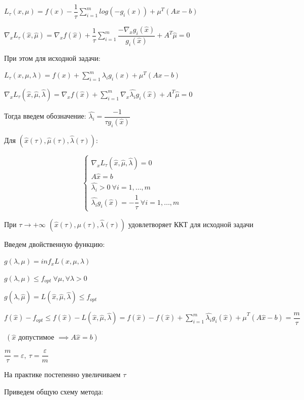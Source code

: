 $L_{\tau}(x, \mu) = f(x) - \dfrac{1}{\tau} \sum_{i=1}^m log(-g_i(x)) + \mu^T(Ax - b)$

$\nabla_x L_{\tau}(\hat{x}, \hat{\mu}) = \nabla_x f(\hat{x}) + \dfrac{1}{\tau} \sum_{i=1}^m \dfrac{-\nabla_x g_i(\hat{x})}{g_i(\hat{x})} + A^T\hat{\mu} = 0$

При этом для исходной задачи:

$L_{\tau}(x, \mu, \lambda) = f(x) + \sum_{i=1}^m \lambda_i g_i(x) + \mu^T(Ax - b)$

$\nabla_x L_{\tau}(\hat{x}, \hat{\mu}, \hat{\lambda }) = \nabla_x f(\hat{x}) +
 \sum_{i=1}^m \nabla_x \hat{\lambda_i}g_i(\hat{x}) + A^T\hat{\mu} = 0$

 Тогда введем обозначение: $\hat{\lambda_i} = \dfrac{-1}{\tau g_i(\hat{x})}$


 Для $(\hat{x}(\tau), \hat{\mu}(\tau), \hat{\lambda}(\tau)):$

 \[
 \begin{cases}
 \nabla_x  L_{\tau}(\hat{x}, \hat{\mu}, \hat{\lambda }) = 0 \\
 A\hat{x} = b \\
\hat{ \lambda_i}  > 0 \ \forall i=1, \dots, m \\
\hat{\lambda_i} g_i(\hat{x}) = -\dfrac{1}{\tau} \ \forall i=1, \dots, m
\end{cases}
 \]


При $\tau \to + \infty$ $(\hat{x}(\tau), \hat{\mu}(\tau), \hat{\lambda}(\tau))$ удовлетворяет ККТ для исходной задачи

Введем двойственную функцию:

$g(\lambda, \mu) = inf_x L(x, \mu, \lambda)$

$g(\lambda, \mu) \leqslant f_{opt} \ \forall \mu, \forall \lambda > 0$

$g(\hat{\lambda}, \hat{\mu}) = L(\hat{x}, \hat{\mu}, \hat{\lambda}) \leqslant f_{opt}$

$f(\hat{x}) - f_{opt} \leqslant f(\hat{x}) - L(\hat{x}, \hat{\mu}, \hat{\lambda}) = f(\hat{x}) - f(\hat{x}) + \sum_{i=1}^m \hat{\lambda_i} g_i(\hat{x}) + \hat{\mu}^T(A\hat{x} - b)  = \dfrac{m}{\tau}$

$ \ (\hat{x} \text{ допустимое } \implies A\hat{x} = b)$

$\dfrac{m}{\tau} = \varepsilon, \ \tau = \dfrac{\varepsilon}{m}$

На практике постепенно увеличиваем $\tau$

\bigskip

Приведем общую схему метода:

